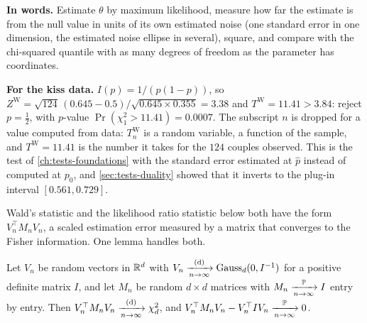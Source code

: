 \begin{inwords}
\textbf{In words.} Estimate $\theta$ by maximum likelihood, measure how far the estimate is from the null value in units of its own estimated noise (one standard error in one dimension, the estimated noise ellipse in several), square, and compare with the chi-squared quantile with as many degrees of freedom as the parameter has coordinates.
\par\smallskip
\textbf{For the kiss data.} $I(p) = 1/(p(1 - p))$, so $Z^{\mathrm{W}} = \sqrt{124}\,(0.645 - 0.5)/\sqrt{0.645 \times 0.355} = 3.38$ and $T^{\mathrm{W}} = 11.41 > 3.84$: reject $p = \frac12$, with $p$-value $\Pr(\chi^2_1 > 11.41) = 0.0007$. The subscript $n$ is dropped for a value computed from data: $T^{\mathrm{W}}_n$ is a random variable, a function of the sample, and $T^{\mathrm{W}} = 11.41$ is the number it takes for the $124$ couples observed. This is the test of \cref{ch:tests-foundations} with the standard error estimated at $\hat{p}$ instead of computed at $p_0$, and \cref{sec:tests-duality} showed that it inverts to the plug-in interval $[0.561, 0.729]$.
\end{inwords}

Wald's statistic and the likelihood ratio statistic below both have the form $V_n^\top M_n V_n$, a scaled estimation error measured by a matrix that converges to the Fisher information.
One lemma handles both.

\begin{lemma}
\label{lem:quad-limit}
Let $V_n$ be random vectors in $\mathbb{R}^d$ with $V_n \xrightarrow [n \to \infty ]{\text{(d)}} \text{Gauss}_d(0, I^{-1})$ for a positive definite matrix $I$, and let $M_n$ be random $d \times d$ matrices with $M_n \xrightarrow [n \to \infty ]{\mathbb{P}} I$ entry by entry.
Then $V_n^\top M_n V_n \xrightarrow [n \to \infty ]{\text{(d)}} \chi^2_d$, and $V_n^\top M_n V_n - V_n^\top I V_n \xrightarrow [n \to \infty ]{\mathbb{P}} 0$.
\end{lemma}

